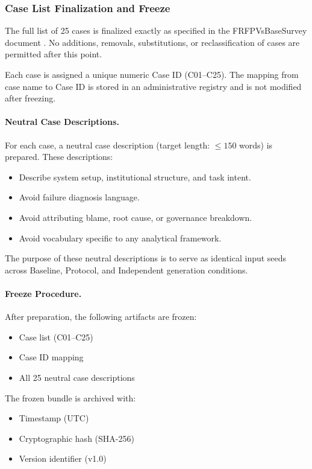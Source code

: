 \subsubsection{Case List Finalization and Freeze}
\label{sec:case-freeze}

The full list of 25 cases is finalized exactly as specified in the FRFPVsBaseSurvey document \cite{frfp_base_survey}. No additions, removals, substitutions, or reclassification of cases are permitted after this point.

Each case is assigned a unique numeric Case ID (C01--C25). The mapping from case name to Case ID is stored in an administrative registry and is not modified after freezing.

\paragraph{Neutral Case Descriptions.}
For each case, a neutral case description (target length: $\leq 150$ words) is prepared. These descriptions:

\begin{itemize}
    \item Describe system setup, institutional structure, and task intent.
    \item Avoid failure diagnosis language.
    \item Avoid attributing blame, root cause, or governance breakdown.
    \item Avoid vocabulary specific to any analytical framework.
\end{itemize}

The purpose of these neutral descriptions is to serve as identical input seeds across Baseline, Protocol, and Independent generation conditions.

\paragraph{Freeze Procedure.}
After preparation, the following artifacts are frozen:

\begin{itemize}
    \item Case list (C01--C25)
    \item Case ID mapping
    \item All 25 neutral case descriptions
\end{itemize}

The frozen bundle is archived with:

\begin{itemize}
    \item Timestamp (UTC)
    \item Cryptographic hash (SHA-256)
    \item Version identifier (v1.0)
\end{itemize}

